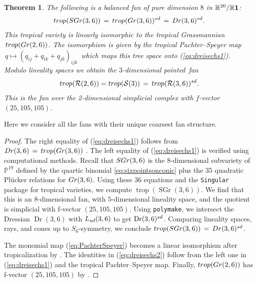 \documentclass[12pt]{extarticle}
\newtheorem{theorem}{Theorem}
\theoremstyle{definition}
\numberwithin{theorem}{section}
\theoremstyle{plain}\newtheorem{ithm}{Theorem}
\newcommand{\PP}{\mathbb{P}}
\newcommand{\RR}{\mathbb{R}}
\DeclareMathOperator{\trop}{trop}
\DeclareMathOperator{\SGr}{SGr}
\DeclareMathOperator{\Dr}{Dr}
\begin{document}
  \begin{theorem}  \label{thm:dreisechs}
    The following is a balanced fan of pure dimension $8$ in $\RR^{20}/\RR {\bf 1}$:
    \begin{equation}
      \label{eq:dreisechs1}  {\rm trop}({\rm SGr}(3,6))\, = \,
     {\rm trop}({\rm Gr}(3,6))^{\rm sd}  \,= \,
     {\rm Dr}(3,6)^{\rm sd}  . 
    \end{equation}
    This tropical variety is linearly isomorphic to the  tropical Grassmannian $\,{\rm trop}({\rm Gr}(2,6))$.
    The isomorphism is given by  the tropical Pachter--Speyer map
     $\,q \mapsto (q_{ij}+ q_{ik} +q_{jk})_{ijk}\,$ which maps this tree space onto  (\ref{eq:dreisechs1}). 
Modulo lineality spaces we obtain the $3$-dimensional pointed~fan
\begin{equation}
      \label{eq:dreisechs2} {\rm trop}(\mathcal{R}(2,6)) = {\rm trop}(\mathcal{S}(3)) \,= \, {\rm trop}(\mathcal{R}(3,6))^{\rm sd}.
    \end{equation}
This is the fan over the 2-dimensional simplicial complex with $f$-vector $(25,105,105)$.
  \end{theorem}
  Here we consider all the fans with their unique coarsest fan structure.
  \begin{proof}
    The right equality of (\ref{eq:dreisechs1}) follows from
    $ {\rm Dr}(3,6)\, = \,  {\rm trop}({\rm Gr}(3,6))$ \cite[Example~4.4.10]{MS}.
    The left equality  of (\ref{eq:dreisechs1}) is verified using computational methods. 
    Recall that ${\rm SGr}(3,6)$ is the $8$-dimensional subvariety of $\PP^{19}$ defined by the quartic binomial \eqref{eq:sixpointsonconic} plus the $35$ quadratic Pl\"ucker relations for ${\rm Gr}(3,6)$.
    Using these $36$ equations and the {\tt Singular} package for tropical varieties, we compute
   $\trop(\SGr(3,6))$. We find that this is an $8$-dimensional fan, with $5$-dimensional lineality space, and  
   the quotient is  simplicial with f-vector $(25,105,105)$. 
    Using \texttt{polymake}, we intersect the Dressian $\Dr(3,6)$
    with $L_{\rm sd}(3,6)$ to get $\Dr(3,6)^{\rm sd}$.
    Comparing lineality spaces, rays, and cones up to $S_6$-symmetry, we conclude 
     $ {\rm trop}({\rm SGr}(3,6)) \,=\,
    {\rm Dr}(3,6)^{\rm sd}$.
        
    The monomial map (\ref{eq:PachterSpeyer})  becomes a linear
    isomorphism after tropicalization  by \cite[Corollary 3.2.13]{MS}.
    The identities in (\ref{eq:dreisechs2}) follow from the left one in (\ref{eq:dreisechs1}) and
    the tropical Pachter--Speyer map. Finally,  ${\rm trop}({\rm Gr}(2,6)) $ has 
    f-vector $(25,105,105)$ by \cite[Example 4.3.15]{MS}.
  \end{proof}
\end{document}
